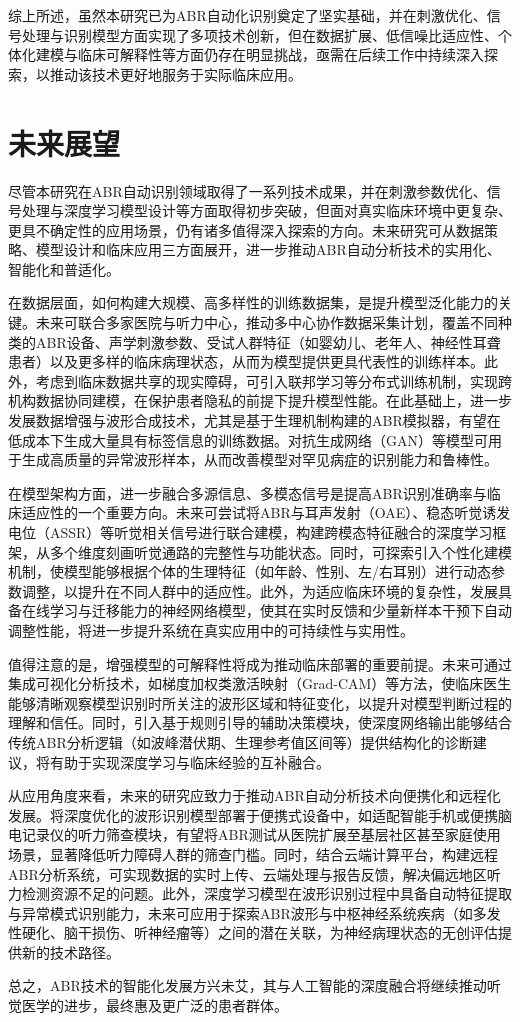 综上所述，虽然本研究已为ABR自动化识别奠定了坚实基础，并在刺激优化、信号处理与识别模型方面实现了多项技术创新，但在数据扩展、低信噪比适应性、个体化建模与临床可解释性等方面仍存在明显挑战，亟需在后续工作中持续深入探索，以推动该技术更好地服务于实际临床应用。

\section{未来展望}

尽管本研究在ABR自动识别领域取得了一系列技术成果，并在刺激参数优化、信号处理与深度学习模型设计等方面取得初步突破，但面对真实临床环境中更复杂、更具不确定性的应用场景，仍有诸多值得深入探索的方向。未来研究可从数据策略、模型设计和临床应用三方面展开，进一步推动ABR自动分析技术的实用化、智能化和普适化。

在数据层面，如何构建大规模、高多样性的训练数据集，是提升模型泛化能力的关键。未来可联合多家医院与听力中心，推动多中心协作数据采集计划，覆盖不同种类的ABR设备、声学刺激参数、受试人群特征（如婴幼儿、老年人、神经性耳聋患者）以及更多样的临床病理状态，从而为模型提供更具代表性的训练样本。此外，考虑到临床数据共享的现实障碍，可引入联邦学习等分布式训练机制，实现跨机构数据协同建模，在保护患者隐私的前提下提升模型性能。在此基础上，进一步发展数据增强与波形合成技术，尤其是基于生理机制构建的ABR模拟器，有望在低成本下生成大量具有标签信息的训练数据。对抗生成网络（GAN）等模型可用于生成高质量的异常波形样本，从而改善模型对罕见病症的识别能力和鲁棒性。

在模型架构方面，进一步融合多源信息、多模态信号是提高ABR识别准确率与临床适应性的一个重要方向。未来可尝试将ABR与耳声发射（OAE）、稳态听觉诱发电位（ASSR）等听觉相关信号进行联合建模，构建跨模态特征融合的深度学习框架，从多个维度刻画听觉通路的完整性与功能状态。同时，可探索引入个性化建模机制，使模型能够根据个体的生理特征（如年龄、性别、左/右耳别）进行动态参数调整，以提升在不同人群中的适应性。此外，为适应临床环境的复杂性，发展具备在线学习与迁移能力的神经网络模型，使其在实时反馈和少量新样本干预下自动调整性能，将进一步提升系统在真实应用中的可持续性与实用性。

值得注意的是，增强模型的可解释性将成为推动临床部署的重要前提。未来可通过集成可视化分析技术，如梯度加权类激活映射（Grad-CAM）等方法，使临床医生能够清晰观察模型识别时所关注的波形区域和特征变化，以提升对模型判断过程的理解和信任。同时，引入基于规则引导的辅助决策模块，使深度网络输出能够结合传统ABR分析逻辑（如波峰潜伏期、生理参考值区间等）提供结构化的诊断建议，将有助于实现深度学习与临床经验的互补融合。

从应用角度来看，未来的研究应致力于推动ABR自动分析技术向便携化和远程化发展。将深度优化的波形识别模型部署于便携式设备中，如适配智能手机或便携脑电记录仪的听力筛查模块，有望将ABR测试从医院扩展至基层社区甚至家庭使用场景，显著降低听力障碍人群的筛查门槛。同时，结合云端计算平台，构建远程ABR分析系统，可实现数据的实时上传、云端处理与报告反馈，解决偏远地区听力检测资源不足的问题。此外，深度学习模型在波形识别过程中具备自动特征提取与异常模式识别能力，未来可应用于探索ABR波形与中枢神经系统疾病（如多发性硬化、脑干损伤、听神经瘤等）之间的潜在关联，为神经病理状态的无创评估提供新的技术路径。


总之，ABR技术的智能化发展方兴未艾，其与人工智能的深度融合将继续推动听觉医学的进步，最终惠及更广泛的患者群体。